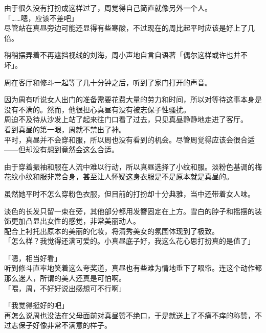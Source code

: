 由于很久没有打扮成这样过了，周觉得自己简直就像另外一个人。\\

「……嗯，应该不差吧」\\

尽管站在真昼旁边可能还显得有些寒酸，不过现在的周比起平时应该是好上了几倍。

稍稍摆弄着不再遮挡视线的刘海，周小声地自言自语著「偶尔这样或许也并不坏」。\\

\vspace{2\baselineskip}

周在客厅和修斗一起等了几十分钟之后，听到了家门打开的声音。

因为周有听说女人出门的准备需要花费大量的劳力和时间，所以对等待这事本身是没有不满的。然而，他很担心真昼有没有被志保子性骚扰。\\

周迫不及待从沙发上站了起来往门口看了过去，只见真昼静静地走进了客厅。\\

看到真昼的第一眼，周就不禁出了神。\\

平时，真昼并不会穿和服，所以周也没有看到的机会。尽管周觉得应该会很合适——但却没有想到竟然会这么合适。

由于穿着振袖和服在人流中难以行动，所以真昼选择了小纹和服。淡粉色基调的梅花纹小纹和服非常合身，甚至让人怀疑这身衣服是不是原本就是真昼的。

虽然她平时不怎么穿粉色衣服，但目前的打扮却十分典雅，当中还带着女人味。

淡色的长发只留一束在旁，其他部分都用发簪固定在上方。雪白的脖子和摇摆的装饰更加凸显出女性的感觉，非常美丽动人。\\

配合上衬托出原本的美丽的化妆，将清秀美女的氛围体现到了极致。\\

「怎么样？我觉得还满可爱的。小真昼底子好，我这么花心思打扮真的是值了」

「嗯，相当好看」\\

听到修斗直率地笑着这么夸奖道，真昼也有些难为情地垂下了眼帘。连这个动作都那么迷人，所谓的美人还真是可怕啊。\\

「喂，周，不好好说出感想可不行啊」

「我觉得挺好的吧」\\

再怎么说周也没法在父母面前对真昼赞不绝口，于是就送上了不痛不痒的称赞，不过志保子好像非常不满意的样子。\\

